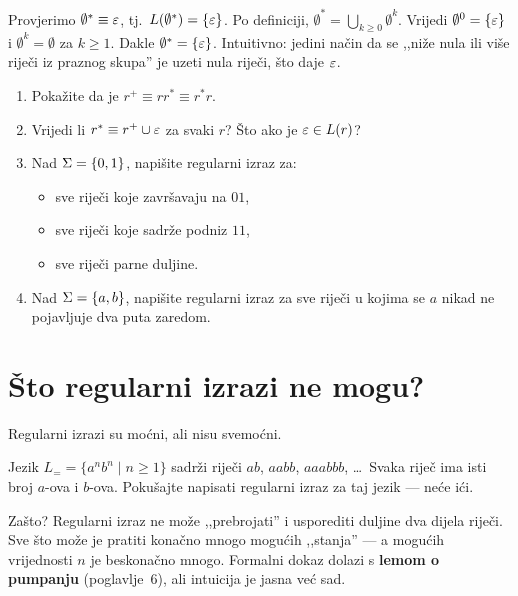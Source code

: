 \begin{primjer}
Provjerimo $\emptyset^* \equiv \varepsilon$, tj.\ $L(\emptyset^*) = \{\varepsilon\}$.
Po definiciji, $\emptyset^* = \bigcup_{k \geq 0} \emptyset^k$.
Vrijedi $\emptyset^0 = \{\varepsilon\}$ i $\emptyset^k = \emptyset$ za $k \geq 1$.
Dakle $\emptyset^* = \{\varepsilon\}$. Intuitivno: jedini način da se ,,niže nula
ili više riječi iz praznog skupa'' je uzeti nula riječi, što daje $\varepsilon$.
\end{primjer}

\begin{zadatak}
\begin{enumerate}[label=(\alph*), itemsep=4pt]
  \item Pokažite da je $r^+ \equiv rr^* \equiv r^*r$.
  \item Vrijedi li $r^* \equiv r^+ \cup \varepsilon$ za svaki $r$?
        Što ako je $\varepsilon \in L(r)$?
  \item Nad $\Sigma = \{0,1\}$, napišite regularni izraz za:
    \begin{itemize}
      \item sve riječi koje završavaju na $01$,
      \item sve riječi koje sadrže podniz $11$,
      \item sve riječi parne duljine.
    \end{itemize}
  \item Nad $\Sigma = \{a, b\}$, napišite regularni izraz za sve riječi
        u kojima se $a$ nikad ne pojavljuje dva puta zaredom.
\end{enumerate}
\end{zadatak}

\section{Što regularni izrazi ne mogu?}

Regularni izrazi su moćni, ali nisu svemoćni.

Jezik $L_= = \{a^n b^n \mid n \geq 1\}$ sadrži riječi $ab$, $aabb$,
$aaabbb$, \ldots\ Svaka riječ ima isti broj $a$-ova i $b$-ova.
Pokušajte napisati regularni izraz za taj jezik --- neće ići.

Zašto? Regularni izraz ne može ,,prebrojati'' i usporediti duljine dva
dijela riječi. Sve što može je pratiti konačno mnogo mogućih ,,stanja''
--- a mogućih vrijednosti $n$ je beskonačno mnogo. Formalni dokaz dolazi
s \textbf{lemom o pumpanju} (poglavlje~6), ali intuicija je jasna već sad.

